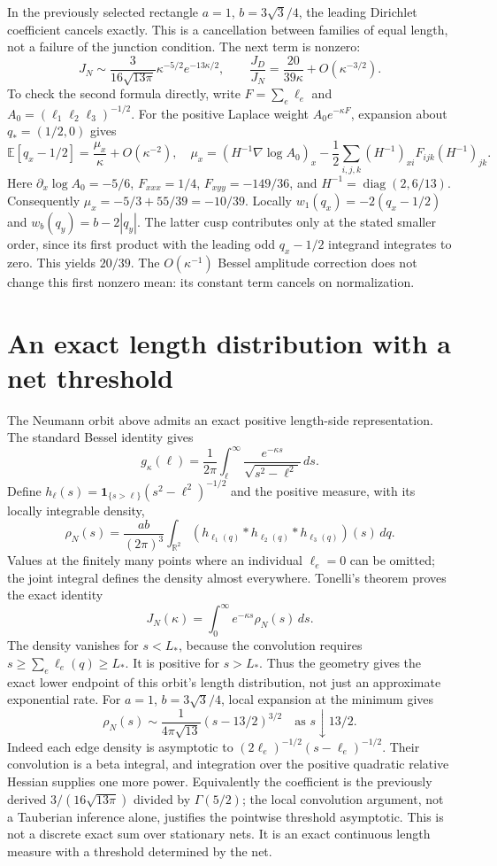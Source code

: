 \documentclass[11pt]{article}
\begin{document}
In the previously selected rectangle $a=1$, $b=3\sqrt3/4$, the leading
Dirichlet coefficient cancels exactly. This is a cancellation between
families of equal length, not a failure of the junction condition.
The next term is nonzero:
\[
 J_N\sim\frac{3}{16\sqrt{13\pi}}\kappa^{-5/2}e^{-13\kappa/2},
 \qquad
 \frac{J_D}{J_N}=\frac{20}{39\kappa}+O(\kappa^{-3/2}).
\]
To check the second formula directly, write
$F=\sum_e\ell_e$ and $A_0=(\ell_1\ell_2\ell_3)^{-1/2}$.
For the positive Laplace weight $A_0e^{-\kappa F}$, expansion about
$q_*=(1/2,0)$ gives
\[
 \mathbb E[q_x-1/2]=\frac{\mu_x}{\kappa}+O(\kappa^{-2}),
 \quad
 \mu_x=(H^{-1}\nabla\log A_0)_x
 -\frac12\sum_{i,j,k}(H^{-1})_{xi}F_{ijk}(H^{-1})_{jk}.
\]
Here $\partial_x\log A_0=-5/6$, $F_{xxx}=1/4$,
$F_{xyy}=-149/36$, and $H^{-1}=\operatorname{diag}(2,6/13)$.
Consequently $\mu_x=-5/3+55/39=-10/39$.
Locally $w_1(q_x)=-2(q_x-1/2)$ and
$w_b(q_y)=b-2|q_y|$. The latter cusp contributes only at the stated
smaller order, since its first product with the leading odd
$q_x-1/2$ integrand integrates to zero. This yields $20/39$.
The $O(\kappa^{-1})$ Bessel amplitude correction does not change this
first nonzero mean: its constant term cancels on normalization.

\section{An exact length distribution with a net threshold}
The Neumann orbit above admits an exact positive length-side
representation. The standard Bessel identity gives
\[
 g_\kappa(\ell)=\frac1{2\pi}
 \int_\ell^\infty\frac{e^{-\kappa s}}{\sqrt{s^2-\ell^2}}\,ds.
\]
Define $h_\ell(s)=\mathbf1_{\{s>\ell\}}(s^2-\ell^2)^{-1/2}$ and
the positive measure, with its locally integrable density,
\[
 \rho_N(s)=\frac{ab}{(2\pi)^3}
 \int_{\mathbb R^2}
 (h_{\ell_1(q)}*h_{\ell_2(q)}*h_{\ell_3(q)})(s)\,dq.
\]
Values at the finitely many points where an individual $\ell_e=0$
can be omitted; the joint integral defines the density almost everywhere.
Tonelli's theorem proves the exact identity
\[
 J_N(\kappa)=\int_0^\infty e^{-\kappa s}\rho_N(s)\,ds.
\]
The density vanishes for $s<L_*$, because the convolution requires
$s\geq\sum_e\ell_e(q)\geq L_*$. It is positive for $s>L_*$.
Thus the geometry gives the exact lower endpoint of this orbit's
length distribution, not just an approximate exponential rate.
For $a=1$, $b=3\sqrt3/4$, local expansion at the minimum gives
\[
 \rho_N(s)\sim\frac{1}{4\pi\sqrt{13}}
 (s-13/2)^{3/2}\quad\text{as }s\downarrow13/2.
\]
Indeed each edge density is asymptotic to
$(2\ell_e)^{-1/2}(s-\ell_e)^{-1/2}$. Their convolution is a beta
integral, and integration over the positive quadratic relative
Hessian supplies one more power. Equivalently the coefficient is
the previously derived $3/(16\sqrt{13\pi})$ divided by
$\Gamma(5/2)$; the local convolution argument, not a Tauberian
inference alone, justifies the pointwise threshold asymptotic.
This is not a discrete exact sum over stationary nets. It is an exact
continuous length measure with a threshold determined by the net.
\end{document}
